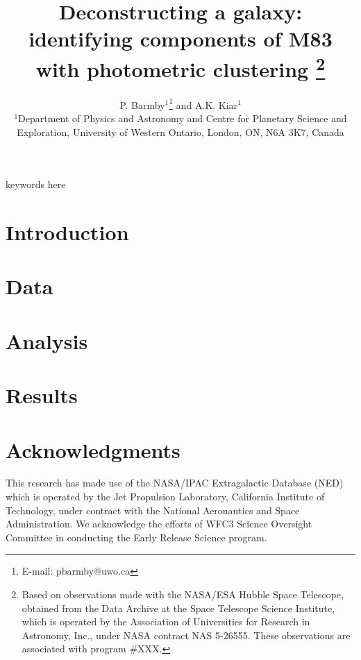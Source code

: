 \documentclass[useAMS,usenatbib]{mn2e}
\title[Deconstructing M83]{Deconstructing a galaxy: identifying components of M83 with photometric clustering%
\footnote{  
Based on observations made with the NASA/ESA Hubble Space Telescope, obtained from the Data Archive at the Space Telescope Science Institute, which is operated by the Association of Universities for Research in Astronomy, Inc., under NASA contract NAS 5-26555. These observations are associated with program #XXX.
}
}
\author[Kiar \& Barmby \& Kiar]
{
P. Barmby$^{1}$\thanks{E-mail: pbarmby@uwo.ca} and 
A.K. Kiar$^{1}$\\
$^{1}$Department of Physics and Astronomy and Centre for Planetary Science and Exploration, University of Western Ontario, London, ON, N6A 3K7, Canada\\

}
\begin{document}
\date{}


\maketitle
\label{firstpage}

\begin{abstract}
%
\end{abstract}

\begin{keywords}
keywords here
\end{keywords}

\section{Introduction}


\section{Data}


\section{Analysis}


\section{Results}


%
%
%


\section*{Acknowledgments}

This research has made use of the NASA/IPAC Extragalactic Database (NED) which is operated by the Jet Propulsion Laboratory,
California Institute of Technology, under contract with the National Aeronautics and Space Administration. 
We acknowledge the efforts of WFC3 Science Oversight Committee in conducting the Early Release Science program.


{}

\bsp



\appendix

\label{lastpage}
\end{document}

